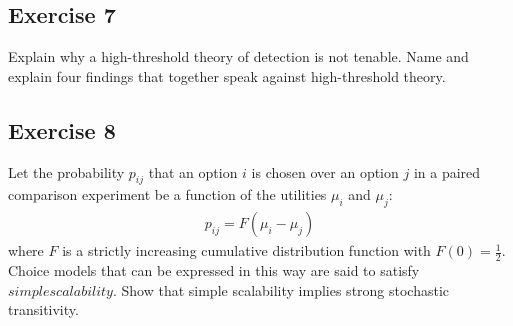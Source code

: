 \documentclass[../main/Notes.tex]{subfiles}
\begin{document}
\subsection*{Exercise 7}
Explain why a high-threshold theory of detection is not tenable. Name and explain four findings that together speak against high-threshold theory.

\subsection*{Exercise 8}
Let the probability $p_{ij}$ that an option $i$ is chosen over an option $j$ in a paired comparison experiment be a function of the utilities $\mu_i$ and $\mu_j$:
\begin{align*}
p_{ij}=F(\mu_i-\mu_j)
\end{align*}
where $F$ is a strictly increasing cumulative distribution function with $F(0)=\frac{1}{2}$. Choice models that can be expressed in this way are said to satisfy $simple scalability$. Show that simple scalability implies strong stochastic transitivity.
\end{document}
